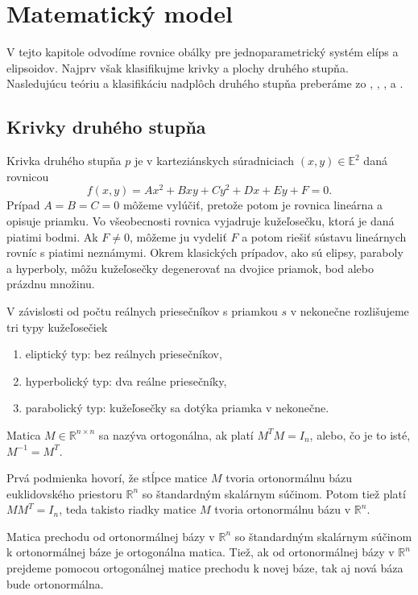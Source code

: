 \chapter{Matematický model}
\label{kap:matematicky_model}
V tejto kapitole odvodíme rovnice obálky pre jednoparametrický systém elíps a elipsoidov. Najprv však klasifikujme krivky a plochy druhého stupňa. Nasledujúcu teóriu a klasifikáciu nadplôch druhého stupňa preberáme zo \cite{Ivan}, \cite{Kor13}, \cite{Gla16}, \cite{Ode20} a \cite{Zla11}.
\section{Krivky druhého stupňa}
Krivka druhého stupňa $p$ je v karteziánskych súradniciach $(x, y) \in \mathbb{E}^2$ daná rovnicou 
$$ f(x, y) = Ax^2 + Bxy + Cy^2 + Dx + Ey + F = 0.$$
Prípad $A = B = C = 0$  môžeme vylúčiť, pretože potom je rovnica lineárna a opisuje priamku. Vo všeobecnosti rovnica vyjadruje kužeľosečku, ktorá je daná piatimi bodmi. Ak $F \neq 0$, môžeme ju vydeliť $F$ a potom riešiť sústavu lineárnych rovníc s piatimi neznámymi. Okrem klasických prípadov, ako sú elipsy, paraboly a hyperboly, môžu kužeľosečky degenerovať na dvojice priamok, bod alebo prázdnu množinu.

V závislosti od počtu reálnych priesečníkov s priamkou $s$ v nekonečne rozlišujeme tri typy kužeľosečiek 
\begin{enumerate}
\item eliptický typ: bez reálnych priesečníkov,
\item hyperbolický typ: dva reálne priesečníky,
\item parabolický typ: kužeľosečky sa dotýka priamka v nekonečne.
\end{enumerate}

\begin{definition}
Matica $M \in \mathbb{R}^{n \times n}$ sa nazýva ortogonálna, ak platí $M^T M = I_n$, alebo, čo je to isté, $M^{-1} = M^T$. 
\end{definition}
Prvá podmienka hovorí, že stĺpce matice $M$ tvoria ortonormálnu bázu euklidovského priestoru $\mathbb{R}^n$ so štandardným skalárnym súčinom. Potom tiež platí $MM^T = I_n$, teda takisto riadky matice $M$ tvoria ortonormálnu bázu v $\mathbb{R}^n$. 

\begin{theorem} 
Matica prechodu od ortonormálnej bázy v $\mathbb{R}^n$ so štandardným skalárnym súčinom k ortonormálnej báze je ortogonálna matica. Tiež, ak od ortonormálnej bázy v $\mathbb{R}^n$ prejdeme pomocou ortogonálnej matice prechodu k novej báze,
tak aj nová báza bude ortonormálna.
\end{theorem}


